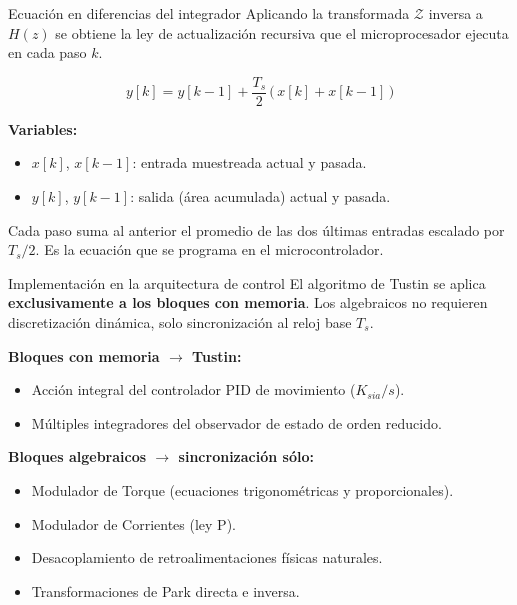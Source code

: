 \documentclass[aspectratio=169,t]{beamer}
\begin{document}
\begin{frame}{Ecuación en diferencias del integrador}
{\small\color{uncGray}Aplicando la transformada $\mathcal{Z}$ inversa a $H(z)$ se obtiene la ley de actualización recursiva que el microprocesador ejecuta en cada paso $k$.}\par
\vspace{10mm}

\begin{equation*}
\boxed{\;
y[k] = y[k-1] + \frac{T_s}{2}\,\big(\,x[k] + x[k-1]\,\big)
\;}
\end{equation*}

\vspace{6mm}
\textbf{Variables:}
\begin{itemize}
\item $x[k]$, $x[k-1]$: entrada muestreada actual y pasada.
\item $y[k]$, $y[k-1]$: salida (área acumulada) actual y pasada.
\end{itemize}

\vspace{4mm}
{\small Cada paso suma al anterior el promedio de las dos últimas entradas escalado por $T_s/2$. Es la ecuación que se programa en el microcontrolador.}
\end{frame}

\begin{frame}{Implementación en la arquitectura de control}
{\small\color{uncGray}El algoritmo de Tustin se aplica \textbf{exclusivamente a los bloques con memoria}. Los algebraicos no requieren discretización dinámica, solo sincronización al reloj base $T_s$.}\par
\vspace{4mm}

\textbf{Bloques con memoria $\to$ Tustin:}
\begin{itemize}
\item Acción integral del controlador PID de movimiento ($K_{sia}/s$).
\item Múltiples integradores del observador de estado de orden reducido.
\end{itemize}

\vspace{3mm}
\textbf{Bloques algebraicos $\to$ sincronización sólo:}
\begin{itemize}
\item Modulador de Torque (ecuaciones trigonométricas y proporcionales).
\item Modulador de Corrientes (ley P).
\item Desacoplamiento de retroalimentaciones físicas naturales.
\item Transformaciones de Park directa e inversa.
\end{itemize}
\end{frame}
\end{document}
